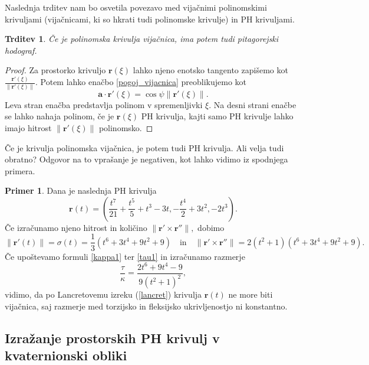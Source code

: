\documentclass[12pt,a4paper,twoside]{article}
\theoremstyle{definition} %
\newtheorem{primer}[definicija]{Primer}
\theoremstyle{plain} %
\newtheorem{trditev}[definicija]{Trditev}
\numberwithin{equation}{section}  %
\begin{document}
Naslednja trditev nam bo osvetila povezavo med vijačnimi polinomskimi krivuljami (vijačnicami, ki so hkrati tudi polinomske krivulje) in PH krivuljami.\cite{faroukietal2004}
\begin{trditev}
	Če je polinomska krivulja vijačnica, ima potem tudi pitagorejski hodograf.
\end{trditev}
\begin{proof}
	Za prostorko krivuljo $\mathbf{r}(\xi)$ lahko njeno enotsko tangento zapišemo kot $\frac{\mathbf{r'}(\xi)}{\lVert \mathbf{r'}(\xi) \rVert}.$ Potem lahko enačbo \eqref{pogoj_vijacnica} preoblikujemo kot
	\begin{equation}
		\mathbf{a} \cdot \mathbf{r'}(\xi)=\cos \psi \lVert \mathbf{r'}(\xi) \rVert.
	\end{equation}
	Leva stran enačba predstavlja polinom v spremenljivki $\xi.$ Na desni strani enačbe se lahko nahaja polinom, če je $\mathbf{r}(\xi)$ PH krivulja, kajti samo PH krivulje lahko imajo hitrost $\lVert \mathbf{r'}(\xi) \rVert$ polinomsko.
\end{proof}
Če je krivulja polinomska vijačnica, je potem tudi PH krivulja. Ali velja tudi obratno? Odgovor na to vprašanje je negativen, kot lahko vidimo iz spodnjega primera.\cite{beltranmonterde}
\begin{primer}
	Dana je naslednja PH krivulja
	\begin{equation*}
		\mathbf{r}(t)=\left ( \frac{t^7}{21}+\frac{t^5}{5}+t^3-3t,-\frac{t^4}{2}+3t^2,-2t^3 \right ).
	\end{equation*}
	Če izračunamo njeno hitrost in količino $\lVert \mathbf{r'} \times \mathbf{r''} \rVert,$ dobimo
	\begin{equation*}
		\lVert \mathbf{r'}(t) \rVert=\sigma(t)=\frac{1}{3}(t^6+3t^4+9t^2+9) \quad \text{in} \quad \lVert \mathbf{r'} \times \mathbf{r''} \rVert=2(t^2+1)(t^6+3t^4+9t^2+9).
	\end{equation*}
	Če upoštevamo formuli \eqref{kappa1} ter \eqref{tau1} in izračunamo razmerje
	\begin{equation*}
		\frac{\tau}{\kappa}=\frac{2t^6+9t^4-9}{9(t^2+1)^2},
	\end{equation*}
	vidimo, da po Lancretovemu izreku (\ref{lancret}) krivulja $\mathbf{r}(t)$ ne more biti vijačnica, saj razmerje med torzijsko in fleksijsko ukrivljenostjo ni konstantno.
\end{primer}

\subsection{Izražanje prostorskih PH krivulj v kvaternionski obliki}
\end{document}

